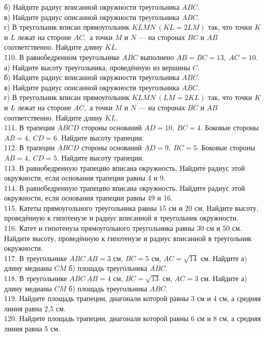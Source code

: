 \documentclass[12pt]{article}
\begin{document}
б) Найдите радиус вписанной окружности треугольника $ABC.$\\
в) Найдите радиус описанной окружности треугольника $ABC.$\\
г) В треугольник вписан прямоугольник $KLMN\ (KL=2LM)$ так, что точки $K$ и $L$ лежат на стороне $AC,$ а точки $M$ и $N$ --- на сторонах $BC$ и $AB$ соответственно. Найдите длину $KL.$\\
110. В равнобедренном треугольнике $ABC$ выполнено $AB=BC=13,\ AC=10.$\\
а) Найдите высоту треугольника, проведённую из вершины $C.$\\
б) Найдите радиус вписанной окружности треугольника $ABC.$\\
в) Найдите радиус описанной окружности треугольника $ABC.$\\
г) В треугольник вписан прямоугольник $KLMN\ (LM=2KL)$ так, что точки $K$ и $L$ лежат на стороне $AC,$ а точки $M$ и $N$ --- на сторонах $BC$ и $AB$ соответственно. Найдите длину $KL.$\\
111. В трапеции $ABCD$ стороны оснований $AD=10,\ BC=4.$ Боковые стороны $AB=4,\ CD=6.$ Найдите высоту трапеции.\\
112. В трапеции $ABCD$ стороны оснований $AD=9,\ BC=5.$ Боковые стороны $AB=4,\ CD=5.$ Найдите высоту трапеции.\\
113. В равнобедренную трапецию вписана окружность. Найдите радиус этой окружности, если основания трапеции равны 4 и 9.\\
114. В равнобедренную трапецию вписана окружность. Найдите радиус этой окружности, если основания трапеции равны 49 и 16.\\
115. Катеты прямоугольного треугольника равны 15 см и 20 см. Найдите высоту, проведённую к гипотенузе и радиус вписанной в треугольник окружности.\\
116. Катет и гипотенуза прямоугольного треугольника равны 30 см и 50 см. Найдите высоту, проведённую к гипотенузе и радиус вписанной в треугольник окружности.\\
117. В треугольнике $ABC\ AB=3$ см, $BC=5$ см, $AC=\sqrt{14}$ см. Найдите а) длину медианы $CM$ б) площадь треугольника $ABC.$\\
118. В треугольнике $ABC\ AB=4$ см, $BC=\sqrt{13}$ см, $AC=3$ см. Найдите а) длину медианы $CM$ б) площадь треугольника $ABC.$\\
119. Найдите площадь трапеции, диагонали которой равны 3 см и 4 см, а средняя линия равна 2,5 см.\\
120. Найдите площадь трапеции, диагонали которой равны 6 см и 8 см, а средняя линия равна 5 см.\\
\end{document}
